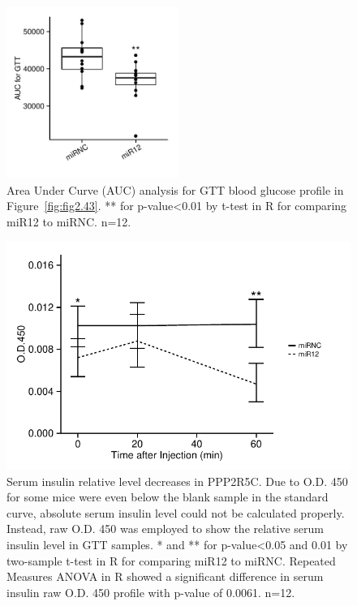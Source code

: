 \begin{figure}
\centering
\includegraphics[width=0.5\textwidth]{figs/fig2-44 AUC for gtt.pdf}
\caption[AUC analysis for GTT results]{\footnotesize Area Under Curve (AUC) analysis for GTT blood glucose profile in Figure~\ref{fig:fig2.43}. ** for p-value<0.01 by t-test in R for comparing miR12 to miRNC. n=12.}
\label{fig:fig2.44}
\end{figure}


\begin{figure}[!tb]
\centering
\includegraphics[width=1\textwidth]{figs/fig2-45 serum ins for gtt.pdf}
\caption[Serum insulin level in GTT]{\footnotesize Serum insulin relative level decreases in PPP2R5C. Due to O.D. 450 for some mice were even below the blank sample in the standard curve, absolute serum insulin level could not be calculated properly. Instead, raw O.D. 450 was employed to show the relative serum insulin level in GTT samples. * and ** for p-value<0.05 and 0.01 by two-sample t-test in R for comparing miR12 to miRNC. Repeated Measures \gls{ANOVA} in R showed a significant difference in serum insulin raw O.D. 450 profile with p-value of 0.0061. n=12.}
\label{fig:fig2.45}
\end{figure}


